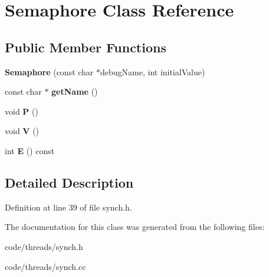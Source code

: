 \section{Semaphore Class Reference}
\label{class_semaphore}
\subsection*{Public Member Functions}
\begin{DoxyCompactItemize}
\item 
{\bfseries Semaphore} (const char $\ast$debug\+Name, int initial\+Value)\label{class_semaphore_a671a20336d97ab712cc84aab3381d34d}

\item 
const char $\ast$ {\bfseries get\+Name} ()\label{class_semaphore_a42700933286df899977950787b46499e}

\item 
void {\bfseries P} ()\label{class_semaphore_a4fee22da0205e3c704b08beaa17e0e7a}

\item 
void {\bfseries V} ()\label{class_semaphore_a3e42125b95660ef696d0d0069b804343}

\item 
int {\bfseries E} () const \label{class_semaphore_a6dfbe972eda8b7ce2305b321aa103676}

\end{DoxyCompactItemize}


\subsection{Detailed Description}


Definition at line 39 of file synch.\+h.



The documentation for this class was generated from the following files\+:\begin{DoxyCompactItemize}
\item 
code/threads/synch.\+h\item 
code/threads/synch.\+cc\end{DoxyCompactItemize}
